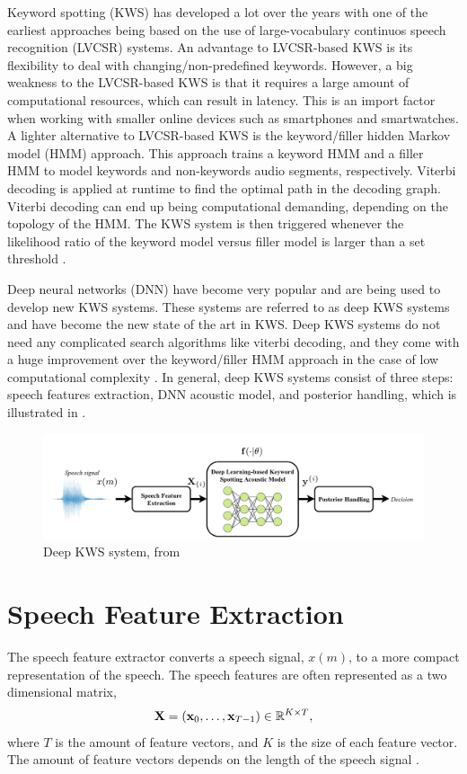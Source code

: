 Keyword spotting (KWS) has developed a lot over the years with one of the earliest approaches being based on the use of large-vocabulary continuos speech recognition (LVCSR) systems. An advantage to LVCSR-based KWS is its flexibility to deal with changing/non-predefined keywords. However, a big weakness to the LVCSR-based KWS is that it requires a large amount of computational resources, which can result in latency. This is an import factor when working with smaller online devices such as smartphones and smartwatches. A lighter alternative to LVCSR-based KWS is the keyword/filler hidden Markov model (HMM) approach. This approach trains a keyword HMM and a filler HMM to model keywords and non-keywords audio segments, respectively. Viterbi decoding is applied at runtime to find the optimal path in the decoding graph. Viterbi decoding can end up being computational demanding, depending on the topology of the HMM. The KWS system is then triggered whenever the likelihood ratio of the keyword model versus filler model is larger than a set threshold \cite{lopez2021deep}. 

Deep neural networks (DNN) have become very popular and are being used to develop new KWS systems. These systems are referred to as deep KWS systems and have become the new state of the art in KWS. Deep KWS systems do not need any complicated search algorithms like viterbi decoding, and they come with a huge improvement over the keyword/filler HMM approach in the case of low computational complexity \cite{lopez2021deep}. In general, deep KWS systems consist of three steps: speech features extraction, DNN acoustic model, and posterior handling, which is illustrated in .

\begin{figure}[h]
    \centering
    \includegraphics[width=\textwidth]{incl/img/kws/deep_kws_system.png}
    \caption{ Deep KWS system, from \cite{lopez2021deep}}
    \label{fig:deep_kws_system}
\end{figure}

\section{Speech Feature Extraction}
The speech feature extractor converts a speech signal, \(x(m)\), to a more compact representation of the speech. The speech features are often represented as a two dimensional matrix,
\begin{align}
    \textbf{X} = (\textbf{x}_0, \dots, \textbf{x}_{T-1}) \in \mathbb{R}^{K\times T},
\end{align}
where \(T\) is the amount of feature vectors, and \(K\) is the size of each feature vector. The amount of feature vectors depends on the length of the speech signal \cite{lopez2021deep}. 

